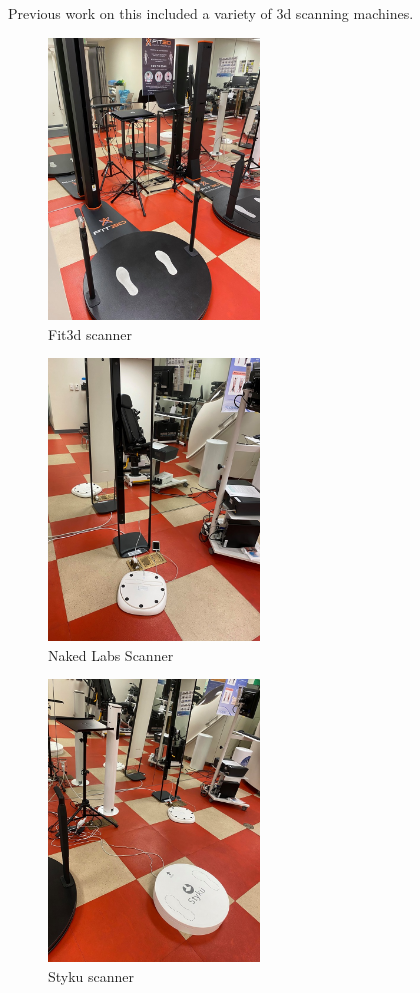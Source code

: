Previous work on this included a variety of 3d scanning machines. 
\begin{figure}[h]
	\caption{Fit3d scanner}
	\centering
	\includegraphics[width=0.5\textwidth]{images/fit3d.jpg}
\end{figure}
\begin{figure}[h]
	\caption{Naked Labs Scanner}
	\centering
	\includegraphics[width=0.5\textwidth]{images/naked_labs.jpg}
\end{figure}
\begin{figure}[h]
	\caption{Styku scanner}
	\centering
	\includegraphics[width=0.5\textwidth]{images/styku.jpg}
\end{figure}
